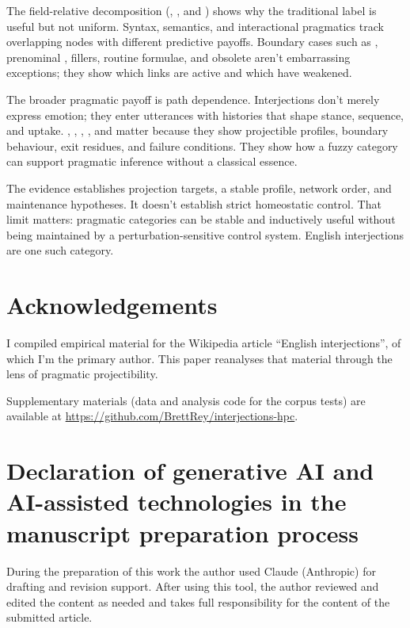 \documentclass[12pt]{article}
\newif\ifblind
\begin{document}
The field-relative decomposition
(,
, and
) shows why the traditional label
is useful but not uniform. Syntax, semantics, and interactional
pragmatics track overlapping nodes with different predictive payoffs.
Boundary cases such as , prenominal
, fillers, routine formulae, and obsolete 
aren't embarrassing exceptions; they show which links are active and
which have weakened.

The broader pragmatic payoff is path dependence. Interjections don't
merely express emotion; they enter utterances with histories that shape
stance, sequence, and uptake. , ,
, , and  matter because they
show projectible profiles, boundary behaviour, exit residues, and
failure conditions. They show how a fuzzy category can support pragmatic
inference without a classical essence.

The evidence establishes projection targets, a stable profile, network
order, and maintenance hypotheses. It doesn't establish strict
homeostatic control. That limit matters: pragmatic categories can be
stable and inductively useful without being maintained by a
perturbation-sensitive control system. English interjections are one
such category.

\ifblind\else
\section*{Acknowledgements}

I compiled empirical material for the Wikipedia article
\enquote{English interjections}, of which I'm the primary author. This
paper reanalyses that material through the lens of pragmatic
projectibility.

Supplementary materials (data and analysis code for the corpus tests)
are available at
\url{https://github.com/BrettRey/interjections-hpc}.
\fi

\section*{Declaration of generative AI and AI-assisted technologies in
the manuscript preparation process}

During the preparation of this work the author used Claude (Anthropic)
for drafting and revision support. After using this tool, the author
reviewed and edited the content as needed and takes full responsibility
for the content of the submitted article.
\end{document}
